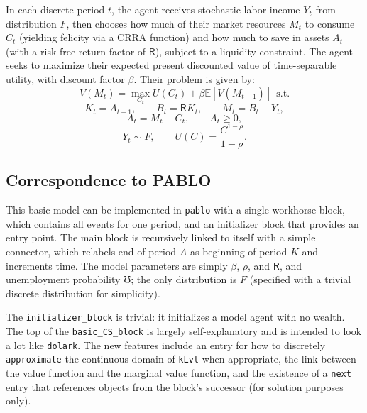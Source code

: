 \documentclass[12pt,pdftex,letterpaper]{article}
\newcommand{\E}{\mathbb{E}}
\begin{document}
In each discrete period $t$, the agent receives stochastic labor income $Y_t$ from distribution $F$, then chooses how much of their market resources $M_t$ to consume $C_t$ (yielding felicity via a CRRA function) and how much to save in assets $A_t$ (with a risk free return factor of $\mathsf{R}$), subject to a liquidity constraint. The agent seeks to maximize their expected present discounted value of time-separable utility, with discount factor $\beta$. Their problem is given by:
\begin{equation*}
V(M_t) = \max_{C_t} U(C_t) + \beta \E[V(M_{t+1})] ~~\text{s.t.}
\end{equation*}
\begin{equation*}
K_t = A_{t-1}, \qquad B_t = \mathsf{R} K_t, \qquad M_{t} = B_t + Y_{t},
\end{equation*}
\begin{equation*}
A_t = M_t - C_t, \qquad A_t \geq 0,
\end{equation*}
\begin{equation*}
Y_{t} \sim F, \qquad U(C) = \frac{C^{1-\rho}}{1-\rho}.
\end{equation*}

\subsection{Correspondence to PABLO}

This basic model can be implemented in \texttt{pablo} with a single workhorse block, which contains all events for one period, and an initializer block that provides an entry point. The main block is recursively linked to itself with a simple connector, which relabels end-of-period $A$ as beginning-of-period $K$ and increments time. The model parameters are simply $\beta$, $\rho$, and $\mathsf{R}$, and unemployment probability $\mho$; the only distribution is $F$ (specified with a trivial discrete distribution for simplicity).

The \texttt{initializer\_block} is trivial: it initializes a model agent with no wealth. The top of the \texttt{basic\_CS\_block} is largely self-explanatory and is intended to look a lot like \texttt{dolark}. The new features include an entry for how to discretely \texttt{approximate} the continuous domain of \texttt{kLvl} when appropriate, the link between the value function and the marginal value function, and the existence of a \texttt{next} entry that references objects from the block's successor (for solution purposes only).
\end{document}
